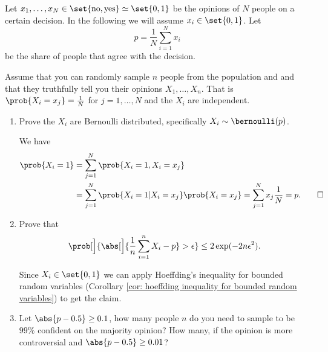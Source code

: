 \begin{exercise}
    \label{ex: single issue polling} 
    Let \(x_1,\ldots, x_N \in \set{\text{no}, \text{yes}} \simeq \set{0,1}\) be the
    opinions of \(N\) people on a certain decision. In the following we will
    assume \(x_i \in \set{0,1}\). Let
    \[
        p = \frac1N\sum_{i=1}^N x_i
    \]
    be the share of people that agree with the decision.

    Assume that you can randomly sample \(n\) people from the population and
    and that they truthfully tell you their opinions \(X_1, \dots, X_n\).  That
    is \(\prob{X_i = x_j} = \frac1N\) for \(j=1, \ldots, N\) and the \(X_i\) are
    independent.
    \begin{enumerate}[label=(\alph*), noitemsep]
        \item Prove the \(X_i\) are Bernoulli distributed, specifically \(X_i \sim \bernoulli(p)\). 
        \begin{solution}
            We have
            \begin{align*}
                \prob{X_i = 1}
                &= \sum_{j=1}^N \prob{X_i = 1, X_i = x_j}
                \\
                &= \sum_{j=1}^N \prob{X_i = 1 | X_i = x_j} \prob{X_i = x_j}
                = \sum_{j=1}^N x_j \frac1N = p.
                \qedhere
            \end{align*}
        \end{solution}
        \item 
        Prove that
        \[
            \prob[\Big]{\abs[\Big]{\frac1n \sum_{i=1}^n X_i - p} > \epsilon}
            \le 2\exp(-2n \epsilon^2).
        \]
        \begin{solution}
            Since \(X_i \in \set{0,1}\) we can apply Hoeffding's inequality for
            bounded random variables (Corollary \ref{cor: hoeffding inequality for
            bounded random variables}) to get the claim.
        \end{solution}

        \item Let \(\abs{p - 0.5} \ge 0.1\), how many people \(n\) do you need to sample to
        be \(99\%\) confident on the majority opinion? How many, if the opinion is more
        controversial and \(\abs{p - 0.5} \ge 0.01\)?


\end{enumerate}
\end{exercise}
